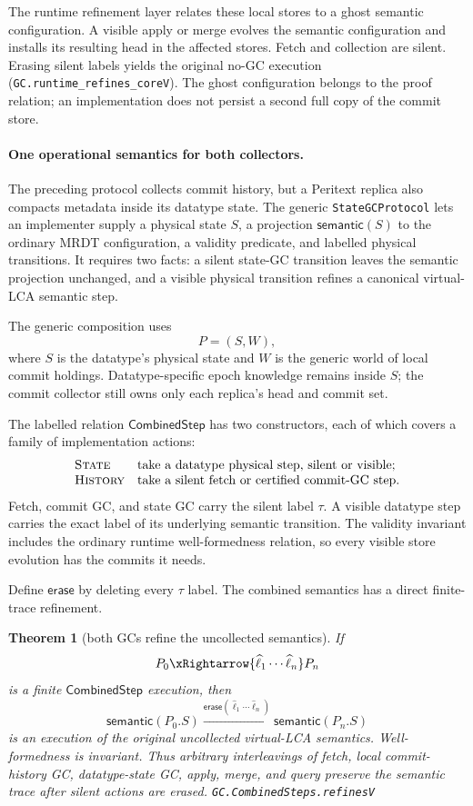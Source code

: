 \documentclass[11pt]{article}
\newtheorem{theorem}{Theorem}[section]
\newcommand{\lean}[1]{\texttt{#1}}
\begin{document}
The runtime refinement layer relates these local stores to a ghost semantic
configuration. A visible apply or merge evolves the semantic configuration
and installs its resulting head in the affected stores. Fetch and collection
are silent. Erasing silent labels yields the original no-GC execution
(\lean{GC.runtime\_refines\_coreV}). The ghost configuration belongs to the
proof relation; an implementation does not persist a second full copy of the
commit store.

\paragraph{One operational semantics for both collectors.}
The preceding protocol collects commit history, but a Peritext replica also
compacts metadata inside its datatype state. The generic
\lean{StateGCProtocol} lets an implementer supply a physical state $S$, a
projection $\mathsf{semantic}(S)$ to the ordinary MRDT configuration, a
validity predicate, and labelled physical transitions. It requires two facts:
a silent state-GC transition leaves the semantic projection unchanged, and a
visible physical transition refines a canonical virtual-LCA semantic step.

The generic composition uses
\[
  P = (S,W),
\]
where $S$ is the datatype's physical state and $W$ is the generic world of
local commit holdings. Datatype-specific epoch knowledge remains inside $S$;
the commit collector still owns only each replica's head and commit set.

The labelled relation $\mathsf{CombinedStep}$ has two constructors, each of
which covers a family of implementation actions:
\[
\begin{array}{ll}
\textsc{State} & \text{take a datatype physical step, silent or visible;}\\
\textsc{History} & \text{take a silent fetch or certified commit-GC step.}
\end{array}
\]
Fetch, commit GC, and state GC carry the silent label $\tau$. A visible
datatype step carries the exact label of its underlying semantic transition.
The validity invariant includes the ordinary runtime well-formedness relation,
so every visible store evolution has the commits it needs.

Define $\mathsf{erase}$ by deleting every $\tau$ label.  The combined semantics
has a direct finite-trace refinement.

\begin{theorem}[both GCs refine the uncollected semantics]
\label{thm:combinedgc}
If
\[
  P_0 \xRightarrow{\widehat\ell_1\cdots\widehat\ell_n} P_n
\]
is a finite $\mathsf{CombinedStep}$ execution, then
\[
  \mathsf{semantic}(P_0.S)
  \xrightarrow{\mathsf{erase}(\widehat\ell_1\cdots\widehat\ell_n)}
  \mathsf{semantic}(P_n.S)
\]
is an execution of the original uncollected virtual-LCA semantics.
Well-formedness is invariant. Thus arbitrary interleavings of fetch, local
commit-history GC, datatype-state GC, apply, merge, and query preserve the
semantic trace after silent actions are erased.
\hfill\lean{GC.CombinedSteps.refinesV}
\end{theorem}
\end{document}
